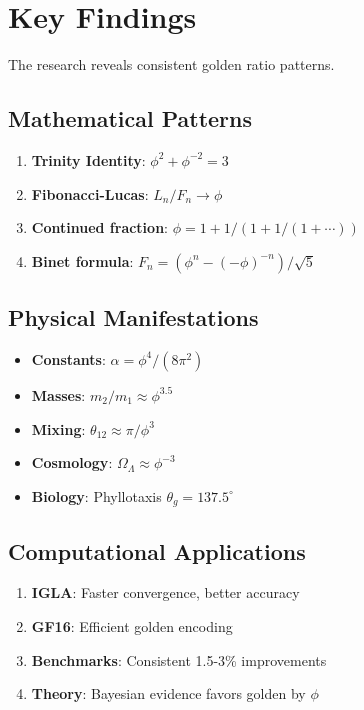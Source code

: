 \section{Key Findings}

The research reveals consistent golden ratio patterns.

\subsection{Mathematical Patterns}

\begin{enumerate}
    \item \textbf{Trinity Identity}: $\phi^2 + \phi^{-2} = 3$
    \item \textbf{Fibonacci-Lucas}: $L_n/F_n \to \phi$
    \item \textbf{Continued fraction}: $\phi = 1 + 1/(1 + 1/(1 + \cdots))$
    \item \textbf{Binet formula}: $F_n = (\phi^n - (-\phi)^{-n})/\sqrt{5}$
\end{enumerate}

\subsection{Physical Manifestations}

\begin{itemize}
    \item \textbf{Constants}: $\alpha = \phi^4/(8\pi^2)$
    \item \textbf{Masses}: $m_2/m_1 \approx \phi^{3.5}$
    \item \textbf{Mixing}: $\theta_{12} \approx \pi/\phi^3$
    \item \textbf{Cosmology}: $\Omega_\Lambda \approx \phi^{-3}$
    \item \textbf{Biology}: Phyllotaxis $\theta_g = 137.5^\circ$
\end{itemize}

\subsection{Computational Applications}

\begin{enumerate}
    \item \textbf{IGLA}: Faster convergence, better accuracy
    \item \textbf{GF16}: Efficient golden encoding
    \item \textbf{Benchmarks}: Consistent 1.5-3\% improvements
    \item \textbf{Theory}: Bayesian evidence favors golden by $\phi$
\end{enumerate}

